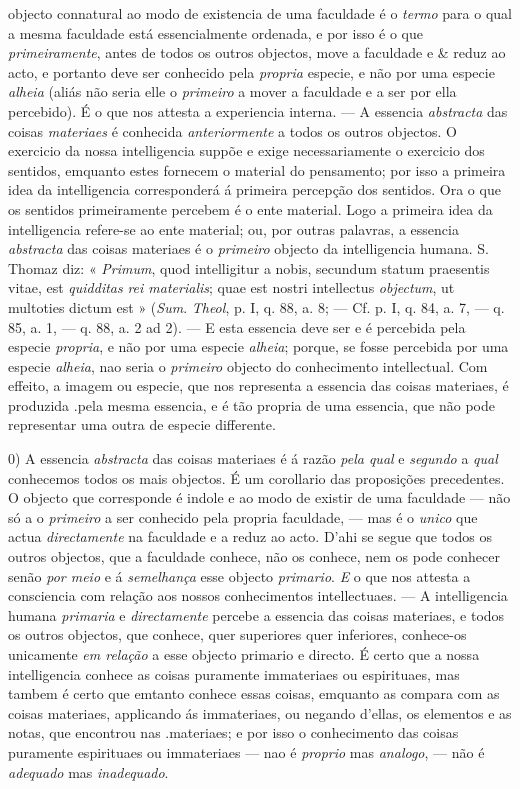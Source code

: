 objecto connatural ao modo de existencia de uma faculdade é o \emph{termo} para o qual a mesma faculdade está essencialmente ordenada, e por isso é o que \emph{primeiramente}, antes de todos os outros objectos, move a faculdade e \& reduz ao acto, e portanto deve ser conhecido pela \emph{propria} especie, e não por uma especie \emph{alheia} (aliás não seria elle o \emph{primeiro} a mover a faculdade e a ser por ella percebido). É o que nos attesta a experiencia interna. --- A essencia \emph{abstracta} das coisas \emph{materiaes} é conhecida \emph{anteriormente} a todos os outros objectos. O exercicio da nossa intelligencia suppõe e exige necessariamente o exercicio dos sentidos, emquanto estes fornecem o material do pensamento; por isso a primeira idea da intelligencia corresponderá á primeira percepção dos sentidos. Ora o que os sentidos primeiramente percebem é o ente material. Logo a primeira idea da intelligencia refere-se ao ente material; ou, por outras palavras, a essencia \emph{abstracta} das coisas materiaes é o \emph{primeiro} objecto da intelligencia humana. S. Thomaz diz: « \emph{Primum}, quod intelligitur a nobis, secundum statum praesentis vitae, est \emph{quidditas}\emph{ rei materialis}; quae est nostri intellectus \emph{objectum}, ut multoties dictum est » (\emph{Sum}. \emph{Theol}, p. I, q. 88, a. 8; --- Cf. p. I, q. 84, a. 7, --- q. 85, a. 1, --- q. 88, a. 2 ad 2). --- E esta essencia deve ser e é percebida pela especie \emph{propria}, e não por uma especie \emph{alheia}; porque, se fosse percebida por uma especie \emph{alheia}, nao seria o \emph{primeiro} objecto do conhecimento intellectual. Com effeito, a imagem ou especie, que nos representa a essencia das coisas materiaes, é produzida .pela mesma essencia, e é tão propria de uma essencia, que não pode representar uma outra de especie differente.\par 0) A essencia \emph{abstracta} das coisas materiaes é á razão \emph{pela qual} e \emph{segundo} a \emph{qual} conhecemos todos os mais objectos. É um corollario das proposições precedentes. O objecto que corresponde é indole e ao modo de existir de uma faculdade --- não só a o \emph{primeiro} a ser conhecido pela propria faculdade, --- mas é o \emph{unico} que actua \emph{directamente} na faculdade e a reduz ao acto. D'ahi se segue que todos os outros objectos, que a faculdade conhece, não os conhece, nem os pode conhecer senão \emph{por meio} e á \emph{semelhança} esse objecto \emph{primario}. \emph{E} o que nos attesta a consciencia com relação aos nossos conhecimentos intellectuaes. --- A intelligencia humana \emph{primaria} e \emph{directamente} percebe a essencia das coisas materiaes, e todos os outros objectos, que conhece, quer superiores quer inferiores, conhece-os unicamente \emph{em relação} a esse objecto primario e directo. É certo que a nossa intelligencia conhece as coisas puramente immateriaes ou espirituaes, mas tambem é certo que emtanto conhece essas coisas, emquanto as compara com as coisas materiaes, applicando ás immateriaes, ou negando d'ellas, os elementos e as notas, que encontrou nas .materiaes; e por isso o conhecimento das coisas puramente espirituaes ou immateriaes --- nao é \emph{proprio} mas \emph{analogo}, --- não é \emph{adequado} mas \emph{inadequado}. 